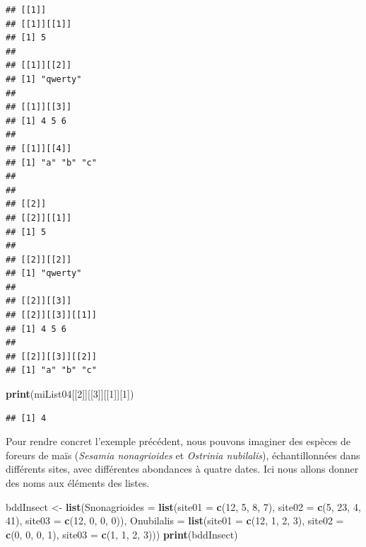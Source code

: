 \documentclass[
]{book}
\newenvironment{Shaded}{\begin{snugshade}}{\end{snugshade}}
\newcommand{\DataTypeTok}[1]{\textcolor[rgb]{0.13,0.29,0.53}{#1}}
\newcommand{\DecValTok}[1]{\textcolor[rgb]{0.00,0.00,0.81}{#1}}
\newcommand{\KeywordTok}[1]{\textcolor[rgb]{0.13,0.29,0.53}{\textbf{#1}}}
\newcommand{\NormalTok}[1]{#1}
\newcommand{\StringTok}[1]{\textcolor[rgb]{0.31,0.60,0.02}{#1}}
\begin{document}
\begin{verbatim}
## [[1]]
## [[1]][[1]]
## [1] 5
## 
## [[1]][[2]]
## [1] "qwerty"
## 
## [[1]][[3]]
## [1] 4 5 6
## 
## [[1]][[4]]
## [1] "a" "b" "c"
## 
## 
## [[2]]
## [[2]][[1]]
## [1] 5
## 
## [[2]][[2]]
## [1] "qwerty"
## 
## [[2]][[3]]
## [[2]][[3]][[1]]
## [1] 4 5 6
## 
## [[2]][[3]][[2]]
## [1] "a" "b" "c"
\end{verbatim}

\begin{Shaded}
\begin{Highlighting}[]
\KeywordTok{print}\NormalTok{(miList04[[}\DecValTok{2}\NormalTok{]][[}\DecValTok{3}\NormalTok{]][[}\DecValTok{1}\NormalTok{]][}\DecValTok{1}\NormalTok{])}
\end{Highlighting}
\end{Shaded}

\begin{verbatim}
## [1] 4
\end{verbatim}

Pour rendre concret l'exemple précédent, nous pouvons imaginer des espèces de foreurs de maïs (\emph{Sesamia nonagrioides} et \emph{Ostrinia nubilalis}), échantillonnées dans différents sites, avec différentes abondances à quatre dates. Ici nous allons donner des noms aux éléments des listes.

\begin{Shaded}
\begin{Highlighting}[]
\NormalTok{bddInsect <-}\StringTok{ }\KeywordTok{list}\NormalTok{(}\DataTypeTok{Snonagrioides =} \KeywordTok{list}\NormalTok{(}\DataTypeTok{site01 =} \KeywordTok{c}\NormalTok{(}\DecValTok{12}\NormalTok{, }\DecValTok{5}\NormalTok{, }\DecValTok{8}\NormalTok{, }\DecValTok{7}\NormalTok{), }
\DataTypeTok{site02 =} \KeywordTok{c}\NormalTok{(}\DecValTok{5}\NormalTok{, }\DecValTok{23}\NormalTok{, }\DecValTok{4}\NormalTok{, }\DecValTok{41}\NormalTok{), }\DataTypeTok{site03 =} \KeywordTok{c}\NormalTok{(}\DecValTok{12}\NormalTok{, }\DecValTok{0}\NormalTok{, }\DecValTok{0}\NormalTok{, }\DecValTok{0}\NormalTok{)), }\DataTypeTok{Onubilalis =} 
\KeywordTok{list}\NormalTok{(}\DataTypeTok{site01 =} \KeywordTok{c}\NormalTok{(}\DecValTok{12}\NormalTok{, }\DecValTok{1}\NormalTok{, }\DecValTok{2}\NormalTok{, }\DecValTok{3}\NormalTok{), }\DataTypeTok{site02 =} \KeywordTok{c}\NormalTok{(}\DecValTok{0}\NormalTok{, }\DecValTok{0}\NormalTok{, }\DecValTok{0}\NormalTok{, }\DecValTok{1}\NormalTok{), }\DataTypeTok{site03 =} 
\KeywordTok{c}\NormalTok{(}\DecValTok{1}\NormalTok{, }\DecValTok{1}\NormalTok{, }\DecValTok{2}\NormalTok{, }\DecValTok{3}\NormalTok{)))}
\KeywordTok{print}\NormalTok{(bddInsect)}
\end{Highlighting}
\end{Shaded}
\end{document}
